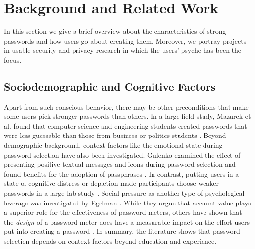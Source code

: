 \section{Background and Related Work}
In this section we give a brief overview about the characteristics of strong passwords and how users go about creating them. Moreover, we portray projects in usable security and privacy research in which the users' psyche has been the focus. 



\subsection{Sociodemographic and Cognitive Factors}
Apart from such conscious behavior, there may be other preconditions that make some users pick stronger passwords than others. In a large field study, Mazurek et al. found that computer science and engineering students created passwords that were less guessable than those from business or politics students \cite{Mazurek2013Measuring}. Beyond demographic background, context factors like the emotional state during password selection have also been investigated. 
Gulenko examined the effect of presenting positive textual messages and icons during password selection and found benefits for the adoption of passphrases \cite{Gulenko2014PasswordsEmotion}. In contrast, putting users in a state of cognitive distress or depletion made participants choose weaker passwords in a large lab study \cite{Gross2016EffectCognitiveEffort}. 
Social pressure as another type of psychological leverage was investigated by Egelman \etal \cite{Egelman2013DoesMyPasswordGoUpToEleven}. While they argue that account value plays a superior role for the effectiveness of password meters, others have shown that the \textit{design} of a password meter does have a measurable impact on the effort users put into creating a password \cite{Ur2012HowDoesYourPasswordMeasureUp}. In summary, the literature shows that password selection depends on context factors beyond education and experience. 


